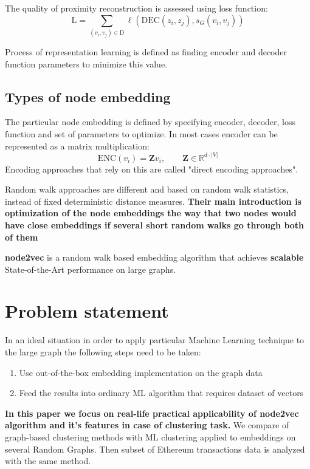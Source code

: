 The quality of proximity reconstruction is assessed using loss function: 
$$
   \mathrm{L} = \sum_{(v_i, v_j) \in \mathrm{D}} \ell\left(
     \mathrm{DEC}(z_i, z_j), s_G(v_i, v_j)
   \right)
$$

Process of representation learning is defined as finding encoder and decoder function parameters to minimize this value.

\subsection{Types of node embedding}

The particular node embedding is defined by specifying encoder, decoder, loss function and set of parameters to optimize. In most cases encoder can be represented as a matrix multiplication: 
$$
  \mathrm{ENC}(v_i) = \mathbf{Z} v_i, \qquad \mathbf{Z} \in \mathbb{R}^{d \cdot |V|}
$$
Encoding approaches that rely on this are called "direct encoding approaches". \cite{DBLP:journals/corr/abs-1709-05584}

Random walk approaches are different and based on random walk statistics, instead of fixed deterministic distance measures. \textbf{Their main introduction is optimization of the node embeddings the way that two nodes would have close embeddings if several short random walks go through both of them}

\textbf{node2vec}\cite{DBLP:journals/corr/GroverL16} is a random walk based embedding algorithm that achieves \textbf{scalable} State-of-the-Art performance on large graphs.

\section{Problem statement}
In an ideal situation in order to apply particular Machine Learning technique to the large graph the following steps need to be taken:
\begin{enumerate}
\item Use out-of-the-box embedding implementation on the graph data
\item Feed the results into ordinary ML algorithm that requires dataset of vectors
\end{enumerate}

\textbf{In this paper we focus on real-life practical applicability of node2vec algorithm and it's features in case of clustering task.} We compare of graph-based clustering methods with ML clustering applied to embeddings on several Random Graphs. Then subset of Ethereum transactions data is analyzed with the same method.